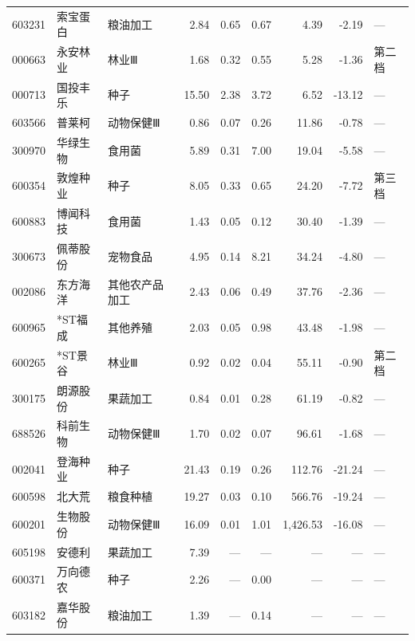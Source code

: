 \begin{longtable}{@{}llp{1.9cm}rrrrrl@{}}
603231 & 索宝蛋白 & 粮油加工 & 2.84 & 0.65 & 0.67 & 4.39 & -2.19 & --- \\
000663 & 永安林业 & 林业Ⅲ & 1.68 & 0.32 & 0.55 & 5.28 & -1.36 & 第二档 \\
000713 & 国投丰乐 & 种子 & 15.50 & 2.38 & 3.72 & 6.52 & -13.12 & --- \\
603566 & 普莱柯 & 动物保健Ⅲ & 0.86 & 0.07 & 0.26 & 11.86 & -0.78 & --- \\
300970 & 华绿生物 & 食用菌 & 5.89 & 0.31 & 7.00 & 19.04 & -5.58 & --- \\
600354 & 敦煌种业 & 种子 & 8.05 & 0.33 & 0.65 & 24.20 & -7.72 & 第三档 \\
600883 & 博闻科技 & 食用菌 & 1.43 & 0.05 & 0.12 & 30.40 & -1.39 & --- \\
300673 & 佩蒂股份 & 宠物食品 & 4.95 & 0.14 & 8.21 & 34.24 & -4.80 & --- \\
002086 & 东方海洋 & 其他农产品加工 & 2.43 & 0.06 & 0.49 & 37.76 & -2.36 & --- \\
600965 & *ST福成 & 其他养殖 & 2.03 & 0.05 & 0.98 & 43.48 & -1.98 & --- \\
600265 & *ST景谷 & 林业Ⅲ & 0.92 & 0.02 & 0.04 & 55.11 & -0.90 & 第二档 \\
300175 & 朗源股份 & 果蔬加工 & 0.84 & 0.01 & 0.28 & 61.19 & -0.82 & --- \\
688526 & 科前生物 & 动物保健Ⅲ & 1.70 & 0.02 & 0.07 & 96.61 & -1.68 & --- \\
002041 & 登海种业 & 种子 & 21.43 & 0.19 & 0.26 & 112.76 & -21.24 & --- \\
600598 & 北大荒 & 粮食种植 & 19.27 & 0.03 & 0.10 & 566.76 & -19.24 & --- \\
600201 & 生物股份 & 动物保健Ⅲ & 16.09 & 0.01 & 1.01 & 1,426.53 & -16.08 & --- \\
605198 & 安德利 & 果蔬加工 & 7.39 & --- & --- & --- & --- & --- \\
600371 & 万向德农 & 种子 & 2.26 & --- & 0.00 & --- & --- & --- \\
603182 & 嘉华股份 & 粮油加工 & 1.39 & --- & 0.14 & --- & --- & --- \\
\end{longtable}
\endgroup
